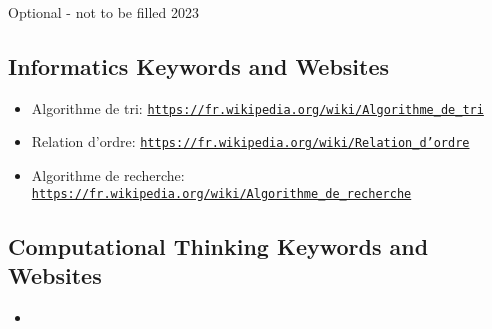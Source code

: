 \documentclass[a4paper,11pt]{report}
\newcommand{\BrochureUrlText}[1]{\texttt{#1}}
\begin{document}
Optional - not to be filled 2023


\subsection*{Informatics Keywords and Websites}

\begin{itemize}
  \item Algorithme de tri: \href{https://fr.wikipedia.org/wiki/Algorithme_de_tri}{\BrochureUrlText{https://fr.wikipedia.org/wiki/Algorithme\_de\_tri}}
  \item Relation d’ordre: \href{https://fr.wikipedia.org/wiki/Relation_d\%27ordre}{\BrochureUrlText{https://fr.wikipedia.org/wiki/Relation\_d’ordre}}
  \item Algorithme de recherche: \href{https://fr.wikipedia.org/wiki/Algorithme_de_recherche}{\BrochureUrlText{https://fr.wikipedia.org/wiki/Algorithme\_de\_recherche}}
\end{itemize}


\subsection*{Computational Thinking Keywords and Websites}

\begin{itemize}
  \item 
\end{itemize}
\end{document}
